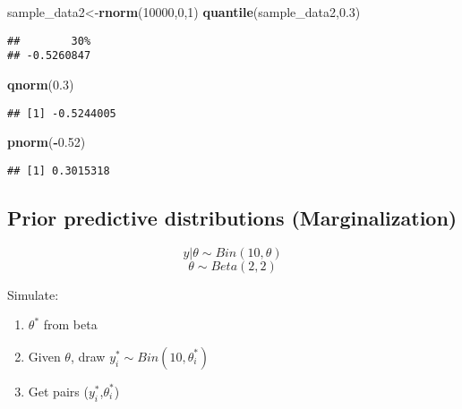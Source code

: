 \documentclass[]{book}
\newenvironment{Shaded}{\begin{snugshade}}{\end{snugshade}}
\newcommand{\KeywordTok}[1]{\textcolor[rgb]{0.13,0.29,0.53}{\textbf{#1}}}
\newcommand{\DecValTok}[1]{\textcolor[rgb]{0.00,0.00,0.81}{#1}}
\newcommand{\FloatTok}[1]{\textcolor[rgb]{0.00,0.00,0.81}{#1}}
\newcommand{\OperatorTok}[1]{\textcolor[rgb]{0.81,0.36,0.00}{\textbf{#1}}}
\newcommand{\NormalTok}[1]{#1}
\begin{document}
\begin{Shaded}
\begin{Highlighting}[]
\NormalTok{sample_data2<-}\KeywordTok{rnorm}\NormalTok{(}\DecValTok{10000}\NormalTok{,}\DecValTok{0}\NormalTok{,}\DecValTok{1}\NormalTok{)}
\KeywordTok{quantile}\NormalTok{(sample_data2,}\FloatTok{0.3}\NormalTok{)}
\end{Highlighting}
\end{Shaded}

\begin{verbatim}
##        30% 
## -0.5260847
\end{verbatim}

\begin{Shaded}
\begin{Highlighting}[]
\KeywordTok{qnorm}\NormalTok{(}\FloatTok{0.3}\NormalTok{)}
\end{Highlighting}
\end{Shaded}

\begin{verbatim}
## [1] -0.5244005
\end{verbatim}

\begin{Shaded}
\begin{Highlighting}[]
\KeywordTok{pnorm}\NormalTok{(}\OperatorTok{-}\FloatTok{0.52}\NormalTok{)}
\end{Highlighting}
\end{Shaded}

\begin{verbatim}
## [1] 0.3015318
\end{verbatim}

\subsection{Prior predictive distributions
(Marginalization)}\label{prior-predictive-distributions-marginalization}

\[y|\theta \sim Bin(10, \theta)\] \[\theta \sim Beta(2,2)\]

Simulate:

\begin{enumerate}
\def\labelenumi{(\arabic{enumi})}
\item
  \(\theta^*\) from beta
\item
  Given \(\theta\), draw \(y_i^* \sim Bin(10, \theta_i^*)\)
\item
  Get pairs (\(y_i^*\),\(\theta_i^*\))
\end{enumerate}
\end{document}

